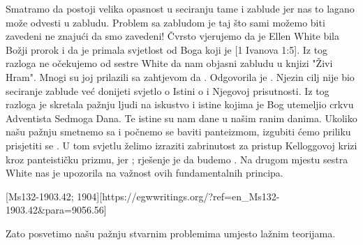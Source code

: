 Smatramo da postoji velika opasnost u seciranju tame i zablude jer nas to lagano može odvesti u zabludu. Problem sa zabludom je taj što sami možemo biti zavedeni ne znajući da smo zavedeni! Čvrsto vjerujemo da je Ellen White bila Božji prorok i da je primala svjetlost od Boga koji je [1 Ivanova 1:5]. Iz tog razloga ne očekujemo od sestre White da nam objasni zabludu u knjizi "Živi Hram". Mnogi su joj prilazili sa zahtjevom da . Odgovorila je . Njezin cilj nije bio seciranje zablude već donijeti svjetlo o Istini o  i Njegovoj prisutnosti. Iz tog razloga je skretala pažnju ljudi na iskustvo i istine kojima je Bog utemeljio crkvu Adventista Sedmoga Dana. Te istine su nam dane u našim ranim danima. Ukoliko našu pažnju smetnemo sa  i počnemo se baviti panteizmom, izgubiti ćemo priliku prisjetiti se . U tom svjetlu želimo izraziti zabrinutost za pristup Kelloggovoj krizi kroz panteističku prizmu, jer ; rješenje je da budemo . Na drugom mjestu sestra White nas je upozorila na važnost ovih fundamentalnih principa.

[Ms132-1903.42; 1904][https://egwwritings.org/?ref=en\_Ms132-1903.42&para=9056.56]

Zato posvetimo našu pažnju stvarnim problemima umjesto lažnim teorijama.
